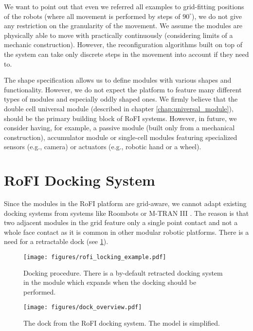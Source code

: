 We want to point out that even we referred all examples to grid-fitting
positions of the robots (where all movement is performed by steps of
$90^\circ$), we do not give any restriction on the granularity of the movement.
We assume the modules are physically able to move with practically continuously
(considering limits of a mechanic construction). However, the reconfiguration
algorithms built on top of the system can take only discrete steps in the
movement into account if they need to.

The shape specification allows us to define modules with various shapes and
functionality. However, we do not expect the platform to feature many different
types of modules and especially oddly shaped ones. We firmly believe that the
double cell universal module (described in chapter \ref{chap:universal_module}),
should be the primary building block of RoFI systems. However, in future, we
consider having, for example, a passive module (built only from a mechanical
construction), accumulator module or single-cell modules featuring specialized
sensors (e.g., camera) or actuators (e.g., robotic hand or a wheel).

\section{RoFI Docking System}\label{sec:dock}

Since the modules in the RoFI platform are grid-aware, we cannot adapt existing
docking systems from systems like Roombots \cite{bonardi_locomotion_2012} or
M-TRAN III \cite{kurokawa_distributed_2008}. The reason is that two adjacent
modules in the grid feature only a single point contact and not a whole face
contact as it is common in other modular robotic platforms. There is a need for
a retractable dock (see \ref{fig:rofi_locking_example}).

\begin{figure}[t]
    \centering
    \texttt{[image: figures/rofi\_locking\_example.pdf]}
    \caption{Docking procedure. There is a by-default retracted docking system
    in the module which expands when the docking should be performed.}
    \label{fig:rofi_locking_example}
\end{figure}


\begin{figure}[t]
    \centering
    \texttt{[image: figures/dock\_overview.pdf]}
    \caption{The dock from the RoFI docking system. The model is simplified.}
    \label{fig:dock_overview}
\end{figure}

